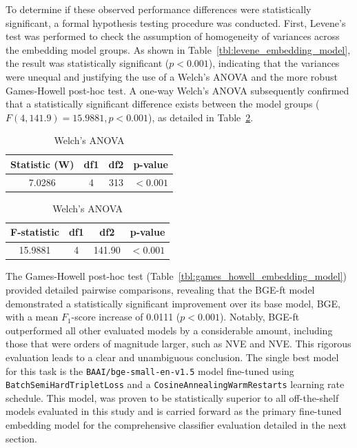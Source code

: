 To determine if these observed performance differences were statistically significant, a formal hypothesis testing procedure was conducted. First, Levene's test was performed to check the assumption of homogeneity of variances across the embedding model groups. As shown in Table~\ref{tbl:levene_embedding_model}, the result was statistically significant (\(p < 0.001\)), indicating that the variances were unequal and justifying the use of a Welch's ANOVA and the more robust Games-Howell post-hoc test. A one-way Welch's ANOVA subsequently confirmed that a statistically significant difference exists between the model groups (\(F(4, 141.9) = 15.9881, p < 0.001\)), as detailed in Table~\ref{tbl:anova_embedding_model}.

\begin{table}[!htbp]
    \captionsetup{skip=5pt}
\centering
\caption{Statistical Tests for F1-Scores by Embedding Model (Test Data)}
\label{tbl:stats_embedding_model}
\begin{subtable}{\linewidth}
\centering
\caption{Levene's Test for Homogeneity of Variances}
\label{tbl:levene_embedding_model}
\begin{tabular}{cccc}
\toprule
\textbf{Statistic (W)} & \textbf{df1} & \textbf{df2} & \textbf{p-value} \\
\midrule
7.0286 & 4 & 313 & \(<0.001\) \\
\bottomrule
\end{tabular}
\end{subtable}%
\vspace{1em}
\begin{subtable}{\linewidth}
\centering
\caption{Welch's ANOVA}
\label{tbl:anova_embedding_model}
\begin{tabular}{cccc}
\toprule
\textbf{F-statistic} & \textbf{df1} & \textbf{df2} & \textbf{p-value} \\
\midrule
15.9881 & 4 & 141.90 & \(<0.001\) \\
\bottomrule
\end{tabular}
\end{subtable}
\end{table}

The Games-Howell post-hoc test (Table~\ref{tbl:games_howell_embedding_model}) provided detailed pairwise comparisons, revealing that the BGE-ft model demonstrated a statistically significant improvement over its base model, BGE, with a mean \(F_1\)-score increase of 0.0111 (\(p<0.001\)). Notably, BGE-ft outperformed all other evaluated models by a considerable amount, including those that were orders of magnitude larger, such as NVE and NVE. This rigorous evaluation leads to a clear and unambiguous conclusion. The single best model for this task is the \verb|BAAI/bge-small-en-v1.5| model fine-tuned using \verb|BatchSemiHardTripletLoss| and a \verb|CosineAnnealingWarmRestarts| learning rate schedule. This model, was proven to be statistically superior to all off-the-shelf models evaluated in this study and is carried forward as the primary fine-tuned embedding model for the comprehensive classifier evaluation detailed in the next section.{\setlength{\emergencystretch}{5em}\par}


